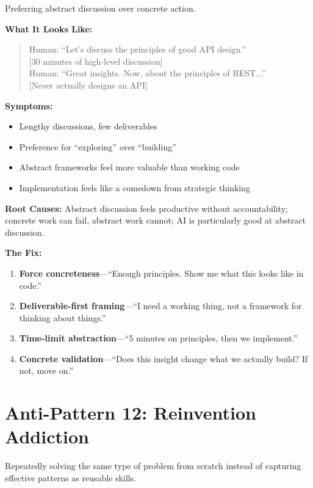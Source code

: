 Preferring abstract discussion over concrete action.

\textbf{What It Looks Like:}

\begin{quote}
Human: ``Let's discuss the principles of good API design.''\\
{[30 minutes of high-level discussion]}\\
Human: ``Great insights. Now, about the principles of REST...''\\
{[Never actually designs an API]}
\end{quote}

\textbf{Symptoms:}
\begin{itemize}
    \item Lengthy discussions, few deliverables
    \item Preference for ``exploring'' over ``building''
    \item Abstract frameworks feel more valuable than working code
    \item Implementation feels like a comedown from strategic thinking
\end{itemize}

\textbf{Root Causes:} Abstract discussion feels productive without accountability; concrete work can fail, abstract work cannot; AI is particularly good at abstract discussion.

\textbf{The Fix:}
\begin{enumerate}
    \item \textbf{Force concreteness}---``Enough principles. Show me what this looks like in code.''
    \item \textbf{Deliverable-first framing}---``I need a working thing, not a framework for thinking about things.''
    \item \textbf{Time-limit abstraction}---``5 minutes on principles, then we implement.''
    \item \textbf{Concrete validation}---``Does this insight change what we actually build? If not, move on.''
\end{enumerate}

\section{Anti-Pattern 12: Reinvention Addiction}

Repeatedly solving the same type of problem from scratch instead of capturing effective patterns as reusable skills.

